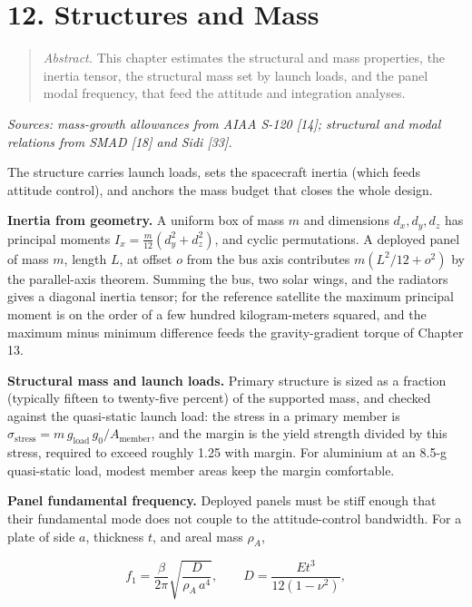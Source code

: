 \documentclass[
  11pt,
  openany,
  oneside]{book}
\begin{document}
\chapter{12. Structures and Mass}\label{structures-and-mass}

\begin{quote}
\emph{Abstract.} This chapter estimates the structural and mass
properties, the inertia tensor, the structural mass set by launch loads,
and the panel modal frequency, that feed the attitude and integration
analyses.
\end{quote}

\emph{Sources: mass-growth allowances from AIAA S-120 {[}14{]};
structural and modal relations from SMAD {[}18{]} and Sidi {[}33{]}.}

The structure carries launch loads, sets the spacecraft inertia (which
feeds attitude control), and anchors the mass budget that closes the
whole design.

\textbf{Inertia from geometry.} A uniform box of mass \(m\) and
dimensions \(d_x, d_y, d_z\) has principal moments
\(I_x = \tfrac{m}{12}(d_y^2 + d_z^2)\), and cyclic permutations. A
deployed panel of mass \(m\), length \(L\), at offset \(o\) from the bus
axis contributes \(m(L^2/12 + o^2)\) by the parallel-axis theorem.
Summing the bus, two solar wings, and the radiators gives a diagonal
inertia tensor; for the reference satellite the maximum principal moment
is on the order of a few hundred kilogram-meters squared, and the
maximum minus minimum difference feeds the gravity-gradient torque of
Chapter 13.

\textbf{Structural mass and launch loads.} Primary structure is sized as
a fraction (typically fifteen to twenty-five percent) of the supported
mass, and checked against the quasi-static launch load: the stress in a
primary member is
\(\sigma_{\mathrm{stress}} = m\, g_{\mathrm{load}}\, g_0 / A_{\mathrm{member}}\),
and the margin is the yield strength divided by this stress, required to
exceed roughly 1.25 with margin. For aluminium at an 8.5-g quasi-static
load, modest member areas keep the margin comfortable.

\textbf{Panel fundamental frequency.} Deployed panels must be stiff
enough that their fundamental mode does not couple to the
attitude-control bandwidth. For a plate of side \(a\), thickness \(t\),
and areal mass \(\rho_A\),

\begin{equation}
f_1 = \frac{\beta}{2\pi}\sqrt{\frac{D}{\rho_A\, a^4}}, \qquad D = \frac{E t^3}{12(1-\nu^2)}, \tag{12.1}
\end{equation}
\end{document}
